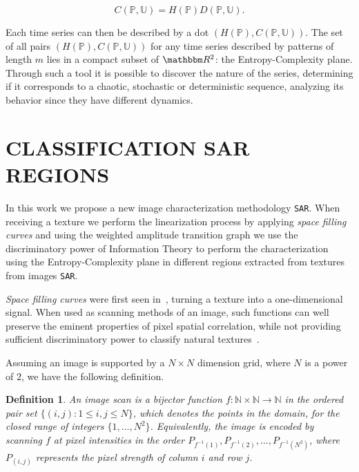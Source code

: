 \documentclass{isprs}
\begin{document}
\begin{equation}
	C(\mathbb{P}, \mathbb{U}) = H(\mathbb{P}) D(\mathbb{P}, \mathbb{U}).
\end{equation}
	
Each time series can then be described by a dot $(H(\mathbb{P}), C(\mathbb{P}, \mathbb{U}))$.
The set of all pairs $(H(\mathbb{P}), C(\mathbb{P}, \mathbb{U}))$ for any time series described by patterns of length $m$ lies in a compact subset of $\mathbbm R^2$: the Entropy-Complexity plane. 
Through such a tool it is possible to discover the nature of the series, determining if it corresponds to a chaotic, stochastic or deterministic sequence, analyzing its behavior since they have different dynamics.
	
\section{CLASSIFICATION SAR REGIONS}\label{SAR}
	
In this work we propose a new image characterization methodology \texttt{SAR}.
When receiving a texture we perform the linearization process by applying \textit{space filling curves} and using the weighted amplitude transition graph we use the discriminatory power of Information Theory to perform the characterization using the Entropy-Complexity plane in different regions extracted from textures from images \texttt{SAR}.

\textit{Space filling curves} were first seen in~\cite{Nguyen1982SpaceFC}, turning a texture into a one-dimensional signal.
When used as scanning methods of an image, such functions can well preserve the eminent properties of pixel spatial correlation, while not providing sufficient discriminatory power to classify natural textures~\citep{Lee1994Texture}.
	
Assuming an image is supported by a $N \times N$ dimension grid, where $N$ is a power of $2$, we have the following definition.
	
\newtheorem{mydef}{Definition}
\begin{mydef}
	An image scan is a bijector function $f \colon \mathbb{N} \times \mathbb{N} \to \mathbb{N}$ in the ordered pair set $ \{(i, j): 1 \leq i , j \leq N \}$, which denotes the points in the domain, for the closed range of integers $\{1, \dots, N^2\}$. Equivalently, the image is encoded by scanning $ f $ at pixel intensities in the order $P_{f^{-1}(1)}, P_{f^{-1}(2)}, \dots, P_{f^{-1}(N^2)}$, where $P_{(i, j)}$ represents the pixel strength of column $i$ and row $j$.
	\label{def:CurveFilling}
\end{mydef}
	
\end{document}
